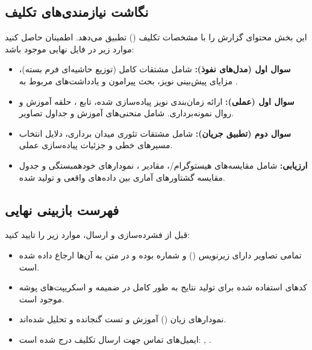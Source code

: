 \begin{latin}
\subsection{نگاشت نیازمندی‌های تکلیف}
این بخش محتوای گزارش را با مشخصات تکلیف () تطبیق می‌دهد. اطمینان حاصل کنید موارد زیر در فایل  نهایی موجود باشد:
\begin{itemize}
    \item \textbf{سوال اول (مدل‌های نفوذ):} شامل مشتقات کامل (توزیع حاشیه‌ای فرم بسته)، مزایای پیش‌بینی نویز، بحث پیرامون  و یادداشت‌های مربوط به .
    \item \textbf{سوال اول (عملی):} ارائه زمان‌بندی نویز پیاده‌سازی شده، تابع ، حلقه آموزش و روال نمونه‌برداری. شامل منحنی‌های آموزش و جداول تصاویر.
    \item \textbf{سوال دوم (تطبیق جریان):} شامل مشتقات تئوری میدان برداری، دلایل انتخاب مسیرهای خطی و جزئیات پیاده‌سازی عملی.
    \item \textbf{ارزیابی:} شامل مقایسه‌های هیستوگرام/، مقادیر ، نمودارهای خودهمبستگی و جدول مقایسه گشتاورهای آماری بین داده‌های واقعی و تولید شده.
\end{itemize}

\subsection{فهرست بازبینی نهایی}
قبل از فشرده‌سازی و ارسال، موارد زیر را تایید کنید:
\begin{itemize}
    \item تمامی تصاویر دارای زیرنویس () و شماره بوده و در متن به آن‌ها ارجاع داده شده است.
    \item کدهای استفاده شده برای تولید نتایج به طور کامل در ضمیمه و اسکریپت‌های پوشه  موجود است.
    \item نمودارهای زیان () آموزش و تست گنجانده و تحلیل شده‌اند.
    \item ایمیل‌های تماس جهت ارسال تکلیف درج شده است: , .
\end{itemize}

\clearpage


\end{latin}
